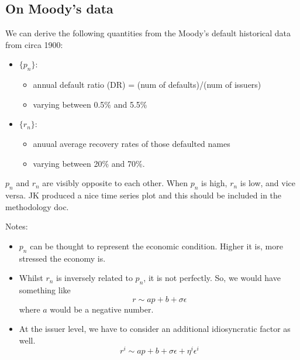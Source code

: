 \documentclass[12pt]{article}
\begin{document}
\subsection{On Moody's data}

We can derive the following quantities from the Moody's default historical data from circa 1900:
\begin{itemize}
    \item $\{p_n\}$: 
    \begin{itemize}
        \item annual default ratio (DR) = (num of defaults)/(num of issuers)
        \item varying between 0.5\% and 5.5\%
    \end{itemize}
    \item $\{r_n\}$: 
    \begin{itemize}
        \item anuual average recovery rates of those defaulted names
        \item varying between 20\% and 70\%. 
    \end{itemize}
\end{itemize}
$p_n$ and $r_n$ are visibly opposite to each other. When $p_n$ is high, $r_n$ is low, and vice versa. JK produced a nice time series plot and this should be included in the methodology doc. 

Notes:
\begin{itemize}
    \item $p_n$ can be thought to represent the economic condition. Higher it is, more stressed the economy is. 
    \item Whilst $r_n$ is inversely related to $p_n$, it is not perfectly. So, we would have something like
    \begin{equation}
        r \sim a p + b + \sigma \epsilon
    \end{equation}
    where $a$ would be a negative number. 
    \item At the issuer level, we have to consider an additional idiosyncratic factor as well. 
    \begin{equation}
        r^i \sim ap + b + \sigma \epsilon + \eta^i \epsilon^i
    \end{equation}
\end{itemize}

    
\end{document}
